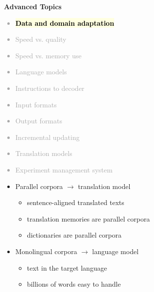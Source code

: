 \documentclass[landscape]{uedslides2C}
\newcommand{\currenttopic}[1]{\colorbox{lightyellow}{\textcolor{black}{\bf #1}}}
\begin{document}
\slide{}
\vspace{50mm}
\begin{center}
\Huge \bf Advanced Topics
\end{center}


\vspace{-5mm}
\textcolor{darkgrey}{
\begin{itemize} \itemsep -1mm
\item \currenttopic{Data and domain adaptation}
\item Speed vs. quality
\item Speed vs. memory use
\item Language models
\item Instructions to decoder
\item Input formats
\item Output formats
\item Incremental updating
\item Translation models
\item Experiment management system
\end{itemize}
}


\vspace{15mm}
\begin{itemize}
\item Parallel corpora $\rightarrow$ translation model
\begin{itemize}
\item sentence-aligned translated texts
\item translation memories are parallel corpora
\item dictionaries are parallel corpora
\end{itemize}
\item Monolingual corpora $\rightarrow$ language model
\begin{itemize}
\item text in the target language
\item billions of words easy to handle
\end{itemize}
\end{itemize}

\end{document}
